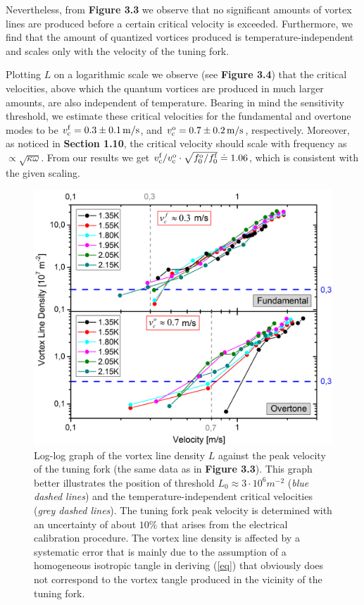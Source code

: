 Nevertheless, from {\sffamily\textbf{Figure 3.3}} we observe that no significant amounts of vortex lines are produced before a certain critical velocity is exceeded. Furthermore, we find that the amount of quantized vortices produced is temperature-independent and scales only with the velocity of the tuning fork.

Plotting $ L $ on a logarithmic scale we observe (see {\sffamily\textbf{Figure 3.4}}) that the critical velocities, above which the quantum vortices are produced in much larger amounts, are also independent of temperature.
Bearing in mind the sensitivity threshold, we estimate these critical velocities for the fundamental and overtone modes to be $ v_{\mathrm{c}}^{\mathrm{f}} = 0.3 \pm 0.1 \,\mathrm{m/s}$, and $ v_{\mathrm{c}}^{\mathrm{o}} = 0.7 \pm 0.2 \,\mathrm{m/s} $, respectively. Moreover, as noticed in {\sffamily\textbf{Section 1.10}}, the critical velocity should scale with frequency as $ \propto \sqrt{\kappa\omega} $. From our results we get $ v_{\mathrm{c}}^{\mathrm{f}}/ v_{\mathrm{c}}^{\mathrm{o}} \cdot \sqrt{f_0^{\mathrm{o}}/f_0^{\mathrm{f}}} \doteq 1.06 $, which is consistent with the given scaling.

\newpage

\begin{figure}[h!]
	\centering
	\includegraphics[width=1\textwidth]{graphs/Merged_L_v(log)}
	\caption{Log-log graph of the vortex line density $ L $ against the peak velocity of the tuning fork (the same data as in {\sffamily\textbf{Figure 3.3}}). This graph better illustrates the position of threshold $ L_0 \approx 3\cdot 10^6 \unit{m}^{-2} $ (\textit{blue dashed lines}) and the temperature-independent critical velocities (\textit{grey dashed lines}). The tuning fork peak velocity is determined with an uncertainty of about $ 10\%$ that arises from the electrical calibration procedure\cite{opticalfork}. The vortex line density is affected by a systematic error that is mainly due to the assumption of a homogeneous isotropic tangle in deriving (\ref{eq}) that obviously does not correspond to the vortex tangle produced in the vicinity of the tuning fork.}
\end{figure}


